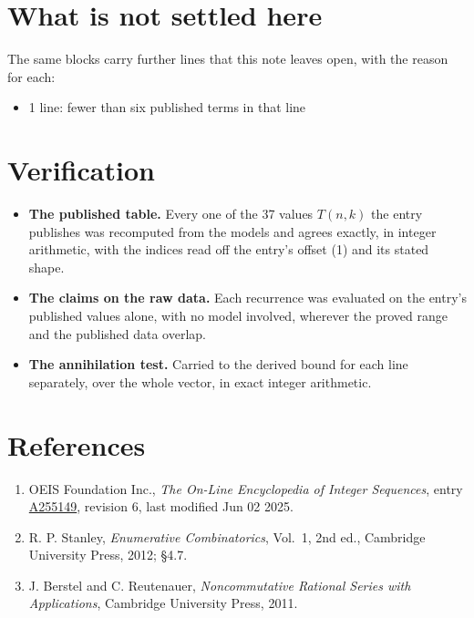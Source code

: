 \documentclass[11pt]{article}
\theoremstyle{definition}
\begin{document}
\section{What is not settled here}

The same blocks carry further lines that this note leaves open, with the reason for each:

\begin{itemize}

\item 1 line: fewer than six published terms in that line

\end{itemize}

\section{Verification}

\begin{itemize}

\item {\bfseries The published table.} Every one of the 37 values $T(n,k)$ the entry publishes was recomputed from the models and agrees exactly, in integer arithmetic, with the indices read off the entry's offset (1) and its stated shape.

\item {\bfseries The claims on the raw data.} Each recurrence was evaluated on the entry's published values alone, with no model involved, wherever the proved range and the published data overlap.

\item {\bfseries The annihilation test.} Carried to the derived bound for each line separately, over the whole vector, in exact integer arithmetic.

\end{itemize}

\section{References}

\begin{enumerate}

\item OEIS Foundation Inc., \emph{The On-Line Encyclopedia of Integer Sequences}, entry \href{https://oeis.org/A255149}{A255149}, revision 6, last modified Jun 02 2025.

\item R. P. Stanley, \emph{Enumerative Combinatorics}, Vol.~1, 2nd ed., Cambridge University Press, 2012; \S4.7.

\item J. Berstel and C. Reutenauer, \emph{Noncommutative Rational Series with Applications}, Cambridge University Press, 2011.

\end{enumerate}
\end{document}

